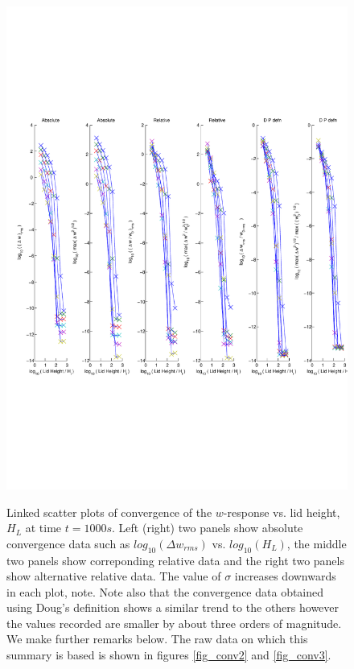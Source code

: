 \documentclass[12pt]{article}
\begin{document}
%
%
%
\begin{figure}[h]
\caption{Linked scatter plots of convergence of the $w$-response vs. lid height, $H_L$ at time $t=1000s$.
Left (right) two panels show absolute convergence data such as $log_{10}(\Delta w_{rms})$ vs. $log_{10}(H_L)$, the middle two panels 
show correponding relative data and the right two panels show alternative relative data. The value of $\sigma$ increases downwards in each plot, note.
Note also that the convergence data obtained using Doug's definition shows a similar trend to the others however the
values recorded are smaller by about three orders of magnitude. We make further remarks below. 
The raw data on which this summary is based is shown in figures \ref{fig_conv2} and \ref{fig_conv3}. } 
\includegraphics[scale=0.8,angle=-0] {fig4a.pdf} 
\label{fig_conv1}
\end{figure}
%
%
%
\end{document}

